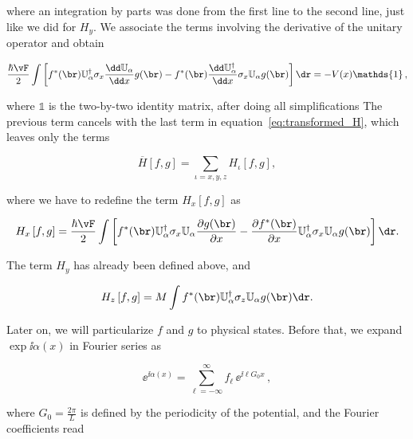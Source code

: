 \noindent where an integration by parts was done from the first line to the second line, just like we did for $H_y$.
We associate the terms involving the derivative of the unitary operator and obtain

\begin{equation}
    \frac{\hbar \vF}{2} \int \left[ f^{\ast}(\br) \mathbb{U}_{\alpha}^{\dagger} \sigma_{x} \frac{\dd \mathbb{U}_{\alpha}}{\dd x} g(\br) - f^{\ast}(\br) \frac{\dd \mathbb{U}_{\alpha}^{\dagger}}{\dd x} \sigma_{x} \mathbb{U}_{\alpha} g(\br) \right] \dr = -V(x) \mathds{1}\,,
\end{equation}

\noindent where $\mathds{1}$ is the two-by-two identity matrix, after doing all simplifications
The previous term cancels with the last term in equation~\eqref{eq:transformed_H}, which leaves only the terms

\begin{equation}
    \overline{H} \left[f,g\right] = \sum_{\iota = x,y,z} H_{\iota} \left[f,g\right],
\end{equation}

\noindent where we have to redefine the term $H_x[f,g]$ as

\begin{equation}
    H_{x}\left[f,g\right]=\frac{\hbar \vF}{2} \int \left[ f^{\ast}(\br) \mathbb{U}_{\alpha}^{\dagger} \sigma_{x} \mathbb{U}_{\alpha} \frac{\partial g(\br)}{\partial x} - \frac{\partial f^{\ast}(\br)}{\partial x} \mathbb{U}_{\alpha}^{\dagger} \sigma_{x} \mathbb{U}_{\alpha} g(\br) \right] \dr .
\end{equation}

\noindent The term $H_y$ has already been defined above, and

\begin{equation}
    H_{z}\left[f,g\right]= M \int f^{\ast}(\br)  \mathbb{U}_{\alpha}^{\dagger} \sigma_{z} \mathbb{U}_{\alpha} g(\br) \dr .
\end{equation}

\noindent Later on, we will particularize $f$ and $g$ to physical states.
Before that, we expand $\exp{\ii\alpha(x)}$ in Fourier series as

\begin{equation}
    \ee^{\ii\alpha(x)}=\sum_{\ell=-\infty}^{\infty}f_{\ell}\,\ee^{\ii\ell G_{0}x}\,,
\end{equation}

\noindent where $G_{0}=\frac{2\pi}{L}$ is defined by the periodicity of the potential, and the Fourier coefficients read

